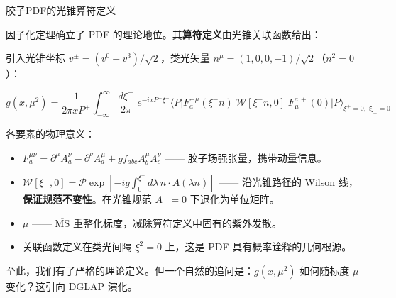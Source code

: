 \documentclass[10pt,aspectratio=169]{beamer}
\newcommand{\msbar}{\overline{\mathrm{MS}}}
\begin{document}
\begin{frame}{胶子PDF的光锥算符定义}

  因子化定理确立了 PDF 的理论地位。其\textbf{算符定义}由光锥关联函数给出：

  引入光锥坐标 $v^\pm = (v^0 \pm v^3)/\sqrt{2}$，类光矢量 $n^\mu = (1,0,0,-1)/\sqrt{2}$（$n^2=0$）：

  \begin{equation}
    \boxed{
      g(x, \mu^2) = \frac{1}{2\pi x P^+}
      \int_{-\infty}^{\infty} \frac{d\xi^{-}}{2\pi}\;
      e^{-i x P^+ \xi^{-}}
      \big\langle P \big|
      F_a^{+\mu}(\xi^{-} n)\;
      \mathcal{W}[\xi^{-} n, 0]\;
      F_{\mu}^{a\,+}(0)
      \big| P \big\rangle_{\xi^+ = 0,\;\boldsymbol{\xi}_\perp = 0}
    }
  \end{equation}

  各要素的物理意义：
  \begin{itemize}
    \item $F_a^{\mu\nu} = \partial^\mu A_a^\nu - \partial^\nu A_a^\mu + g f_{abc} A_b^\mu A_c^\nu$ —— 胶子场强张量，携带动量信息。
    \item $\mathcal{W}[\xi^{-}, 0] = \mathcal{P}\exp[-ig\int_0^{\xi^{-}} d\lambda\, n\!\cdot\! A(\lambda n)]$ —— 沿光锥路径的 Wilson 线，\textbf{保证规范不变性}。在光锥规范 $A^+=0$ 下退化为单位矩阵。
    \item $\mu$ —— $\msbar$ 重整化标度，减除算符定义中固有的紫外发散。
    \item 关联函数定义在类光间隔 $\xi^2 = 0$ 上，这是 PDF 具有概率诠释的几何根源。
  \end{itemize}

  至此，我们有了严格的理论定义。但一个自然的追问是：$g(x,\mu^2)$ 如何随标度 $\mu$ 变化？这引向 DGLAP 演化。
\end{frame}
\end{document}
